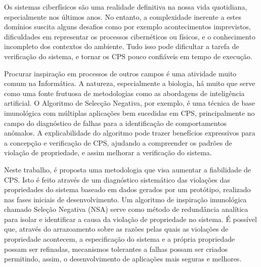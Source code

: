 Os sistemas ciberfísicos são uma realidade definitiva na nossa vida quotidiana, especialmente nos últimos anos. No entanto, a complexidade inerente a estes domínios suscita alguns desafios como por exemplo acontecimentos imprevistos, dificuldades em representar os processos cibernéticos ou físicos, e o conhecimento incompleto dos contextos do ambiente. Tudo isso pode dificultar a tarefa de verificação do sistema, e tornar os CPS pouco confiáveis em tempo de execução. 

Procurar inspiração em processos de outros campos é uma atividade muito comum na Informática. A natureza, especialmente a biologia, há muito que serve como uma fonte frutuosa de metodologias como as abordagens de inteligência artificial. O Algoritmo de Selecção Negativa, por exemplo, é uma técnica de base imunológica com múltiplas aplicações bem sucedidas em CPS, principalmente no campo do diagnóstico de falhas para a identificação de comportamentos anômalos. A explicabilidade do algoritmo pode trazer benefícios expressivos para a concepção e verificação de CPS, ajudando a compreender os padrões de violação de propriedade, e assim melhorar a verificação do sistema.

Neste trabalho, é proposta uma metodologia que visa aumentar a fiabilidade de CPS. Isto é feito através de um diagnóstico sistemático das violações das propriedades do sistema baseado em dados gerados por um protótipo, realizado nas fases iniciais de desenvolvimento. Um algoritmo de inspiração imunológica chamado Seleção Negativa (NSA) serve como método de redundância analítica para isolar e identificar a causa da violação de propriedade no sistema. É possível que, através do arrazoamento sobre as razões pelas quais as violações de propriedade acontecem, a especificação do sistema e a própria propriedade possam ser refinadas, mecanismos tolerantes a falhas possam ser criados permitindo, assim, o desenvolvimento de aplicações mais seguras e melhores.
